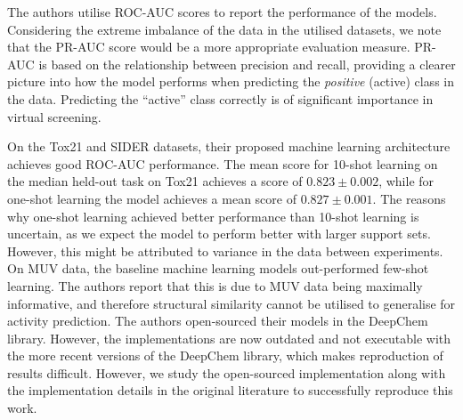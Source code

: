 The authors utilise ROC-AUC scores to report the performance of the models. Considering the extreme imbalance of the data in the utilised datasets, we note that the PR-AUC score would be a more appropriate evaluation measure. PR-AUC is based on the relationship between precision and recall, providing a clearer picture into how the model performs when predicting the \textit{positive} (active) class in the data. Predicting the ``active'' class correctly is of significant importance in virtual screening.

On the Tox21 and SIDER datasets, their proposed machine learning architecture achieves good ROC-AUC performance. The mean score for 10-shot learning on the median held-out task on Tox21 achieves a score of $0.823 \pm 0.002$, while for one-shot learning the model achieves a mean score of $0.827 \pm 0.001$. The reasons why one-shot learning achieved better performance than 10-shot learning is uncertain, as we expect the model to perform better with larger support sets. However, this might be attributed to variance in the data between experiments. On MUV data, the baseline machine learning models out-performed few-shot learning. The authors report that this is due to MUV data being maximally informative, and therefore structural similarity cannot be utilised to generalise for activity prediction. The authors open-sourced their models in the DeepChem library\citep{ramsundar2019deep}. However, the implementations are now outdated and not executable with the more recent versions of the DeepChem library, which makes reproduction of results difficult. However, we study the open-sourced implementation along with the implementation details in the original literature to successfully reproduce this work.